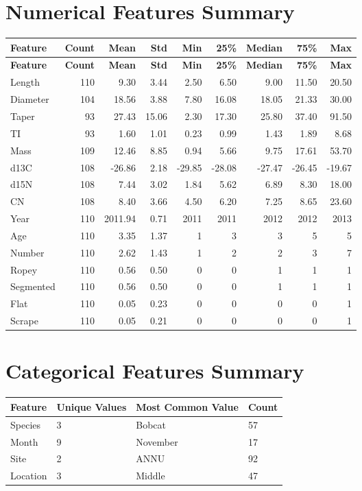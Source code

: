 \documentclass[11pt,a4paper]{article}
\begin{document}
\section*{Numerical Features Summary}
\begin{longtable}{@{}lrrrrrrrr@{}}
\toprule
\textbf{Feature} & \textbf{Count} & \textbf{Mean} & \textbf{Std} & \textbf{Min} & \textbf{25\%} & \textbf{Median} & \textbf{75\%} & \textbf{Max} \\
\midrule
\endfirsthead
\toprule
\textbf{Feature} & \textbf{Count} & \textbf{Mean} & \textbf{Std} & \textbf{Min} & \textbf{25\%} & \textbf{Median} & \textbf{75\%} & \textbf{Max} \\
\midrule
\endhead
Length & 110 & 9.30 & 3.44 & 2.50 & 6.50 & 9.00 & 11.50 & 20.50 \\
Diameter & 104 & 18.56 & 3.88 & 7.80 & 16.08 & 18.05 & 21.33 & 30.00 \\
Taper & 93 & 27.43 & 15.06 & 2.30 & 17.30 & 25.80 & 37.40 & 91.50 \\
TI & 93 & 1.60 & 1.01 & 0.23 & 0.99 & 1.43 & 1.89 & 8.68 \\
Mass & 109 & 12.46 & 8.85 & 0.94 & 5.66 & 9.75 & 17.61 & 53.70 \\
d13C & 108 & -26.86 & 2.18 & -29.85 & -28.08 & -27.47 & -26.45 & -19.67 \\
d15N & 108 & 7.44 & 3.02 & 1.84 & 5.62 & 6.89 & 8.30 & 18.00 \\
CN & 108 & 8.40 & 3.66 & 4.50 & 6.20 & 7.25 & 8.65 & 23.60 \\
Year & 110 & 2011.94 & 0.71 & 2011 & 2011 & 2012 & 2012 & 2013 \\
Age & 110 & 3.35 & 1.37 & 1 & 3 & 3 & 5 & 5 \\
Number & 110 & 2.62 & 1.43 & 1 & 2 & 2 & 3 & 7 \\
Ropey & 110 & 0.56 & 0.50 & 0 & 0 & 1 & 1 & 1 \\
Segmented & 110 & 0.56 & 0.50 & 0 & 0 & 1 & 1 & 1 \\
Flat & 110 & 0.05 & 0.23 & 0 & 0 & 0 & 0 & 1 \\
Scrape & 110 & 0.05 & 0.21 & 0 & 0 & 0 & 0 & 1 \\
\bottomrule
\end{longtable}

\section*{Categorical Features Summary}
\begin{tabular}{@{}llll@{}}
\toprule
\textbf{Feature} & \textbf{Unique Values} & \textbf{Most Common Value} & \textbf{Count} \\
\midrule
Species & 3 & Bobcat & 57 \\
Month & 9 & November & 17 \\
Site & 2 & ANNU & 92 \\
Location & 3 & Middle & 47 \\
\bottomrule
\end{tabular}
\end{document}
